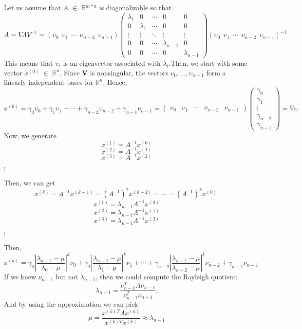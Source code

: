 \documentclass{article}
\begin{document}
Let us assume that $A$ $\in$ $\mathbb{R}$$^{m*n}$ is diagonalizable so that
\[A = V\Lambda V^{-1} = ( \upsilon_0 \ \ \upsilon_1 \ \ \cdots \ \ \upsilon_{n-2} \ \ \upsilon_{n-1} )\begin{pmatrix}
\lambda_1 & 0 & \cdots & 0 & 0\\
0 & \lambda_1 & \cdots & 0 & 0\\
\vdots & \vdots & \ddots & \vdots & \vdots\\
0 & 0 & \cdots & \lambda_{n-2} & 0\\
0 & 0 & \cdots & 0 & \lambda_{n-1}
\end{pmatrix}
( \upsilon_0 \ \ \upsilon_1 \ \ \cdots \ \ \upsilon_{n-2} \ \ \upsilon_{n-1} )^{-1}\]
This means that $\upsilon_i$ is an eigenvector associated with $\lambda_i$.Then, we start with some vector $x^{(0)}$ $\in$ $\mathbb{R}^n$. Since \textbf{V} is nonsingular, the vectors $\upsilon_0, \ldots, \upsilon_{n-1}$ form a linearly independent bases for $\mathbb{R}^n$. Hence,
\[x^{(0)} = \gamma_0\upsilon_0 + \gamma_1\upsilon_1 + \cdots + \gamma_{n-2}\upsilon_{n-2} + \gamma_{n-1}\nu_{n-1} =
\begin{pmatrix}
 \nu_0&\nu_1&\cdots&\nu_{n-2}&\nu_{n-1}
 \end{pmatrix}
 \begin{pmatrix}
 \gamma_0 \\
 \gamma_1 \\
 \vdots \\
 \gamma_{n-2} \\
 \gamma_{n-1}
 \end{pmatrix}
 = Vc.\]
 Now, we generate
 \[x^{(1)} = A^{-1}x^{(0)}\]
 \[x^{(2)} = A^{-1}x^{(1)}\]
 \[x^{(3)} = A^{-1}x^{(2)}\]
 \begin{center}$\vdots$\end{center}
 Then, we can get
 \[x^{(k)} = A^{-1}x^{(k-1)} = (A^{-1})^2x^{(k-2)} = \cdots = (A^{-1})^kx^{(0)}.\]
 \[x^{(1)} = \lambda_{n-1}A^{-1}x^{(0)}\]
 \[x^{(2)} = \lambda_{n-1}A^{-1}x^{(1)}\]
 \[x^{(3)} = \lambda_{n-1}A^{-1}x^{(2)}\]
 \begin{center}$\vdots$\end{center}
 Then,\[x^{(k)} = \gamma_{0}|\frac{\lambda_{n-1} - \mu}{\lambda_{0} - \mu}|^k\nu_0 + \gamma_{1}|\frac{\lambda_{n-1} - \mu}{\lambda_{1} - \mu}|^k\nu_1 + \cdots + \gamma_{n-2}|\frac{\lambda_{n-1} - \mu}{\lambda_{n-2} - \mu}|^k\nu_{n-2} + \gamma_{n-1}\nu_{n-1}\]
 If we knew $\nu_{n-1}$ but not $\lambda_{n-1}$, then we could compute the Rayleigh quotient:\[\lambda_{n-1} = \frac{\nu_{n-1}^TA\nu_{n-1}}{\nu_{n-1}^T\nu_{n-1}}.\]
 And by using the approximation we can pick \[\mu = \frac{x^{(k)T}Ax^{(k)}}{x^{(k)T}x^{(k)}} \approx \lambda_{n-1}\]
\end{document}
